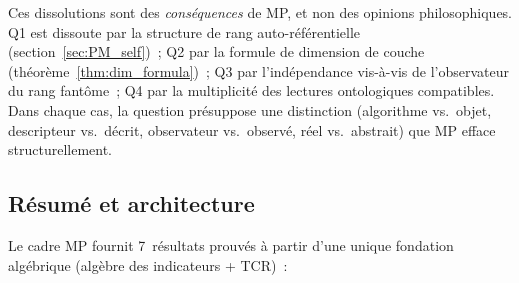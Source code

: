 \documentclass[12pt,a4paper]{article}
\begin{document}
\begin{remarque}
Ces dissolutions sont des \emph{conséquences} de MP, et non des
opinions philosophiques. Q1 est dissoute par la structure de rang
auto-référentielle (section~\ref{sec:PM_self})~; Q2 par la formule de
dimension de couche (théorème~\ref{thm:dim_formula})~; Q3 par
l'indépendance vis-à-vis de l'observateur du rang fantôme~; Q4 par
la multiplicité des lectures ontologiques compatibles. Dans chaque
cas, la question présuppose une distinction (algorithme vs.\ objet,
descripteur vs.\ décrit, observateur vs.\ observé, réel vs.\
abstrait) que MP efface structurellement.
\end{remarque}


\subsection{Résumé et architecture}
\label{sec:PM_summary}

Le cadre MP fournit 7~résultats prouvés à partir d'une unique
fondation algébrique (algèbre des indicateurs + TCR)~:

\begin{center}
\end{center}
\end{document}
